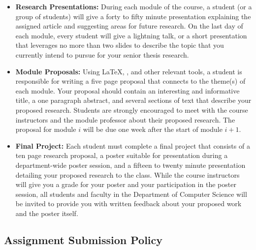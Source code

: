 \begin{itemize}
\item
{\bf Research Presentations:} During each module of the course, a
student (or a group of students) will give a forty to fifty minute
presentation explaining the assigned article and suggesting areas for
future research. On the last day of each module, every student will
give a lightning talk, or a short presentation that leverages no more
than two slides to describe the topic that you currently intend to
pursue for your senior thesis research.

\item
{\bf Module Proposals:} Using \LaTeX, \BibTeX, and other relevant
tools, a student is responsible for writing a five page proposal that
connects to the theme(s) of each module. Your proposal should contain
an interesting and informative title, a one paragraph abstract, and
several sections of text that describe your proposed
research. Students are strongly encouraged to meet with the course
instructors and the module professor about their proposed
research. The proposal for module $i$ will be due one week after the
start of module $i+1$.

\item
{\bf Final Project:} Each student must complete a final project that
consists of a ten page research proposal, a poster suitable for
presentation during a department-wide poster session, and a fifteen to
twenty minute presentation detailing your proposed research to the
class. 
While the course instructors will give you a grade for your poster
and your participation in the poster session, all students and faculty
in the Department of Computer Science will be invited to provide you
with written feedback about your proposed work and the poster itself. 
\end{itemize}

\subsection*{Assignment Submission Policy}

